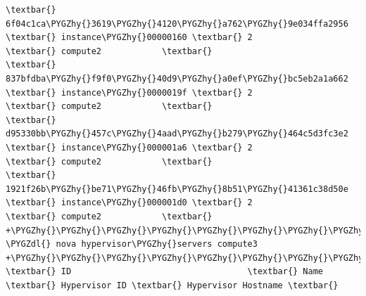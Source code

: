 \documentclass[letterpaper,10pt,english]{sphinxmanual}
\def\PYGZdl{\char`\$}
\def\PYGZhy{\char`\-}
\begin{document}
\begin{enumerate}
\begin{Verbatim}[commandchars=\\\{\}]
\textbar{} 6f04c1ca\PYGZhy{}3619\PYGZhy{}4120\PYGZhy{}a762\PYGZhy{}9e034ffa2956 \textbar{} instance\PYGZhy{}00000160 \textbar{} 2             \textbar{} compute2            \textbar{}
\textbar{} 837bfdba\PYGZhy{}f9f0\PYGZhy{}40d9\PYGZhy{}a0ef\PYGZhy{}bc5eb2a1a662 \textbar{} instance\PYGZhy{}0000019f \textbar{} 2             \textbar{} compute2            \textbar{}
\textbar{} d95330bb\PYGZhy{}457c\PYGZhy{}4aad\PYGZhy{}b279\PYGZhy{}464c5d3fc3e2 \textbar{} instance\PYGZhy{}000001a6 \textbar{} 2             \textbar{} compute2            \textbar{}
\textbar{} 1921f26b\PYGZhy{}be71\PYGZhy{}46fb\PYGZhy{}8b51\PYGZhy{}41361c38d50e \textbar{} instance\PYGZhy{}000001d0 \textbar{} 2             \textbar{} compute2            \textbar{}
+\PYGZhy{}\PYGZhy{}\PYGZhy{}\PYGZhy{}\PYGZhy{}\PYGZhy{}\PYGZhy{}\PYGZhy{}\PYGZhy{}\PYGZhy{}\PYGZhy{}\PYGZhy{}\PYGZhy{}\PYGZhy{}\PYGZhy{}\PYGZhy{}\PYGZhy{}\PYGZhy{}\PYGZhy{}\PYGZhy{}\PYGZhy{}\PYGZhy{}\PYGZhy{}\PYGZhy{}\PYGZhy{}\PYGZhy{}\PYGZhy{}\PYGZhy{}\PYGZhy{}\PYGZhy{}\PYGZhy{}\PYGZhy{}\PYGZhy{}\PYGZhy{}\PYGZhy{}\PYGZhy{}\PYGZhy{}\PYGZhy{}+\PYGZhy{}\PYGZhy{}\PYGZhy{}\PYGZhy{}\PYGZhy{}\PYGZhy{}\PYGZhy{}\PYGZhy{}\PYGZhy{}\PYGZhy{}\PYGZhy{}\PYGZhy{}\PYGZhy{}\PYGZhy{}\PYGZhy{}\PYGZhy{}\PYGZhy{}\PYGZhy{}\PYGZhy{}+\PYGZhy{}\PYGZhy{}\PYGZhy{}\PYGZhy{}\PYGZhy{}\PYGZhy{}\PYGZhy{}\PYGZhy{}\PYGZhy{}\PYGZhy{}\PYGZhy{}\PYGZhy{}\PYGZhy{}\PYGZhy{}\PYGZhy{}+\PYGZhy{}\PYGZhy{}\PYGZhy{}\PYGZhy{}\PYGZhy{}\PYGZhy{}\PYGZhy{}\PYGZhy{}\PYGZhy{}\PYGZhy{}\PYGZhy{}\PYGZhy{}\PYGZhy{}\PYGZhy{}\PYGZhy{}\PYGZhy{}\PYGZhy{}\PYGZhy{}\PYGZhy{}\PYGZhy{}\PYGZhy{}+
\PYGZdl{} nova hypervisor\PYGZhy{}servers compute3
+\PYGZhy{}\PYGZhy{}\PYGZhy{}\PYGZhy{}\PYGZhy{}\PYGZhy{}\PYGZhy{}\PYGZhy{}\PYGZhy{}\PYGZhy{}\PYGZhy{}\PYGZhy{}\PYGZhy{}\PYGZhy{}\PYGZhy{}\PYGZhy{}\PYGZhy{}\PYGZhy{}\PYGZhy{}\PYGZhy{}\PYGZhy{}\PYGZhy{}\PYGZhy{}\PYGZhy{}\PYGZhy{}\PYGZhy{}\PYGZhy{}\PYGZhy{}\PYGZhy{}\PYGZhy{}\PYGZhy{}\PYGZhy{}\PYGZhy{}\PYGZhy{}\PYGZhy{}\PYGZhy{}\PYGZhy{}\PYGZhy{}+\PYGZhy{}\PYGZhy{}\PYGZhy{}\PYGZhy{}\PYGZhy{}\PYGZhy{}\PYGZhy{}\PYGZhy{}\PYGZhy{}\PYGZhy{}\PYGZhy{}\PYGZhy{}\PYGZhy{}\PYGZhy{}\PYGZhy{}\PYGZhy{}\PYGZhy{}\PYGZhy{}\PYGZhy{}+\PYGZhy{}\PYGZhy{}\PYGZhy{}\PYGZhy{}\PYGZhy{}\PYGZhy{}\PYGZhy{}\PYGZhy{}\PYGZhy{}\PYGZhy{}\PYGZhy{}\PYGZhy{}\PYGZhy{}\PYGZhy{}\PYGZhy{}+\PYGZhy{}\PYGZhy{}\PYGZhy{}\PYGZhy{}\PYGZhy{}\PYGZhy{}\PYGZhy{}\PYGZhy{}\PYGZhy{}\PYGZhy{}\PYGZhy{}\PYGZhy{}\PYGZhy{}\PYGZhy{}\PYGZhy{}\PYGZhy{}\PYGZhy{}\PYGZhy{}\PYGZhy{}\PYGZhy{}\PYGZhy{}+
\textbar{} ID                                   \textbar{} Name              \textbar{} Hypervisor ID \textbar{} Hypervisor Hostname \textbar{}

\end{Verbatim}
\end{enumerate}
\end{document}
